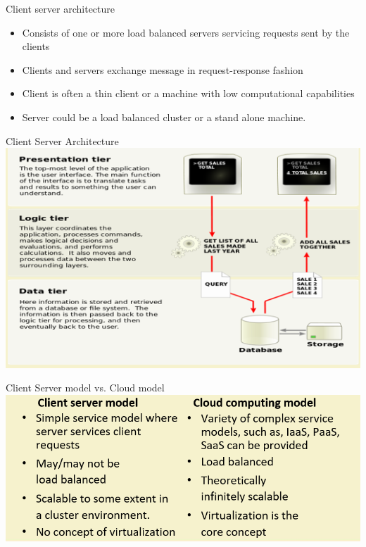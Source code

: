 \documentclass{SKP-beamer}
\begin{document}
\begin{frame}{Client server architecture}
	\begin{itemize}
		\item Consists of one or more load balanced servers servicing requests sent by the clients
		\item Clients and servers exchange message in request-response fashion
		\item Client is often a thin client or a machine with low computational capabilities
		\item Server could be a load balanced cluster or a stand alone machine.
	\end{itemize}
\end{frame} 

\begin{frame}{Client Server Architecture}
	\includegraphics[scale=1.0]{r.png}
\end{frame}

\begin{frame}{Client Server model vs. Cloud model}
	\includegraphics[scale=0.7]{s.png}
\end{frame}
\end{document}
